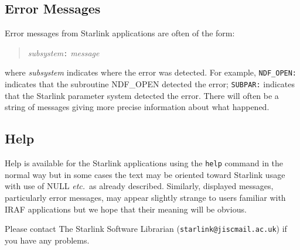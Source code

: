\documentclass[twoside,11pt]{article}
\newcommand{\htmlref}[2]{#1}
\newcommand{\xlabel}[1]{}
\begin{document}
\subsection{\xlabel{error_messages}\label{error_messages}Error Messages}
Error messages from Starlink applications are often of the form:
\begin{quote}
\textit{subsystem}\texttt{:} \textit{message}
\end{quote}
where \textit{subsystem}
indicates where the error was detected. For example, \texttt{NDF\_OPEN:}
indicates that the subroutine NDF\_OPEN detected the error; \texttt{SUBPAR:}
indicates that the Starlink parameter system detected the error. There will
often be a string of messages giving more precise information about what
happened.

\subsection{\xlabel{help}Help}
Help is available for the Starlink applications using the \texttt{help} command
in the normal way but in some cases the text may be oriented toward Starlink
usage with use of NULL \textit{etc.}\ as
\htmlref{already described}{indef_and_null}.
Similarly, displayed messages, particularly error messages, may appear slightly
strange to users familiar with IRAF applications but we hope that their meaning
will be obvious.

Please contact The Starlink Software Librarian (\texttt{starlink@jiscmail.ac.uk}) if
you have any problems.
\end{document}
